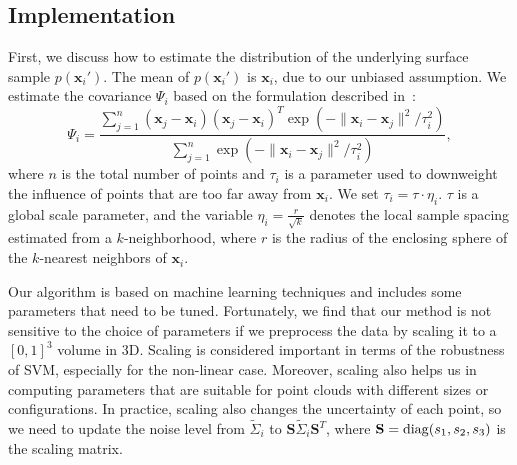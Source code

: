 \subsection{Implementation}
First, we discuss how to estimate the distribution of the underlying surface sample $p(\mathbf x_i')$. The mean of $p(\mathbf x_i')$ is $\mathbf x_i$, due to our unbiased assumption. We estimate the covariance $\Psi_i$ based on the formulation described in~\cite{Pauly:2004}:
\begin{equation}
\Psi_i = \frac{\sum_{j=1}^n (\mathbf x_j - \mathbf x_i)(\mathbf x_j - \mathbf x_i)^T \exp(-\|\mathbf x_i - \mathbf x_j\|^2 / \tau_i^2)}{\sum_{j=1}^n  \exp(-\|\mathbf x_i - \mathbf x_j\|^2 / \tau_i^2)},
\end{equation}
where $n$ is the total number of points and $\tau_i$ is a parameter used to downweight the influence of points that are too far away from $\mathbf x_i$. We set $\tau_i = \tau \cdot \eta_i$. $\tau$ is a global scale parameter, and the variable $\eta_i = \frac{r}{\sqrt{k}}$ denotes the local sample spacing estimated from a $k$-neighborhood, where $r$ is the radius of the enclosing sphere of the $k$-nearest neighbors of $\mathbf x_i$.

Our algorithm is based on machine learning techniques and includes some parameters that need to be tuned. Fortunately, we find that our method is not sensitive to the choice of parameters if we preprocess the data by scaling it to a $[0,1]^3$ volume in 3D. Scaling is considered important in terms of the robustness of SVM, especially for the non-linear case. Moreover, scaling also helps us in computing parameters that are suitable for point clouds with different sizes or configurations. In practice, scaling also changes the uncertainty of each point, so we need to update the noise level from $\widetilde{\Sigma}_i$ to $\mathbf S \widetilde{\Sigma}_i \mathbf S^T$, where $\mathbf S = \diag(s_1, s_2, s_3)$ is the scaling matrix.


